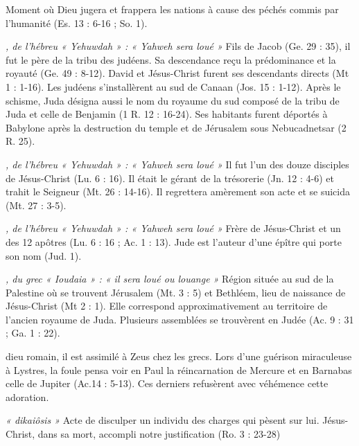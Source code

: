 \begin{multicols}{2}
\textit{}\newline
Moment où Dieu jugera et frappera les nations à cause des péchés commis par l'humanité (Es. 13 : 6-16 ; So. 1).

\textit{, de l'hébreu « Yehuwdah » : « Yahweh sera loué »}\newline
Fils de Jacob (Ge. 29 : 35), il fut le père de la tribu des judéens. Sa descendance reçu la prédominance et la royauté (Ge. 49 : 8-12). David et Jésus-Christ furent ses descendants directs (Mt 1 : 1-16). Les judéens s'installèrent au sud de Canaan (Jos. 15 : 1-12). Après le schisme, Juda désigna aussi le nom du royaume du sud composé de la tribu de Juda et celle de Benjamin (1 R. 12 : 16-24). Ses habitants furent déportés à Babylone après la destruction du temple et de Jérusalem sous Nebucadnetsar (2 R. 25).

\textit{, de l'hébreu « Yehuwdah » : « Yahweh sera loué »}\newline
Il fut l'un des douze disciples de Jésus-Christ (Lu. 6 : 16). Il était le gérant de la trésorerie (Jn. 12 : 4-6) et trahit le Seigneur (Mt. 26 : 14-16). Il regrettera amèrement son acte et se suicida (Mt. 27 : 3-5).

\textit{, de l'hébreu « Yehuwdah » : « Yahweh sera loué »}\newline
Frère de Jésus-Christ et un des 12 apôtres (Lu. 6 : 16 ; Ac. 1 : 13). Jude est l'auteur d'une épître qui porte son nom (Jud. 1).

\textit{, du grec « Ioudaia » : « il sera loué ou louange »}\newline
Région située au sud de la Palestine où se trouvent Jérusalem (Mt. 3 : 5) et Bethléem, lieu de naissance de Jésus-Christ (Mt 2 : 1). Elle correspond approximativement au territoire de l'ancien royaume de Juda. Plusieurs assemblées se trouvèrent en Judée (Ac. 9 : 31 ; Ga. 1 : 22).

\textit{}\newline
dieu romain, il est assimilé à Zeus chez les grecs. Lors d'une guérison miraculeuse à Lystres, la foule pensa voir en Paul la réincarnation de Mercure et en Barnabas celle de Jupiter (Ac.14 : 5-13). Ces derniers refusèrent avec véhémence cette adoration.

\textit{« dikaiôsis »}\newline
Acte de disculper un individu des charges qui pèsent sur lui. Jésus-Christ, dans sa mort, accompli notre justification (Ro. 3 : 23-28)


\end{multicols}
